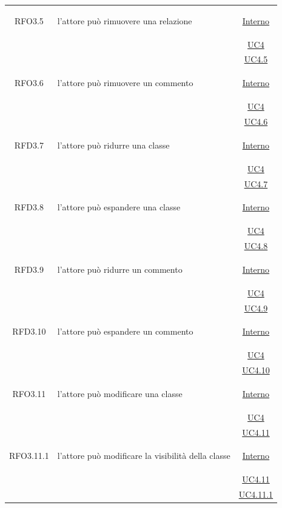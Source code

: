 \begin{itemize}
\begin{itemize}
\begin{itemize}
\begin{itemize}
\begin{longtable}{|c|>{\centering}m{7cm}|c|}
\hypertarget{RFO3.5}{RFO3.5} & l'attore può rimuovere una relazione &  \hyperlink{Interno}{Interno}\\
& &\hyperref[UC4]{UC4}\\
& &\hyperref[UC4.5]{UC4.5}\\ \hline

\hypertarget{RFO3.6}{RFO3.6} & l'attore può rimuovere un commento &  \hyperlink{Interno}{Interno}\\
& &\hyperref[UC4]{UC4}\\
& &\hyperref[UC4.6]{UC4.6}\\ \hline

\hypertarget{RFD3.7}{RFD3.7} & l'attore può ridurre una classe &  \hyperlink{Interno}{Interno}\\
& &\hyperref[UC4]{UC4}\\
& &\hyperref[UC4.7]{UC4.7}\\ \hline

\hypertarget{RFD3.8}{RFD3.8} & l'attore può espandere una classe &  \hyperlink{Interno}{Interno}\\
& &\hyperref[UC4]{UC4}\\
& &\hyperref[UC4.8]{UC4.8}\\ \hline

\hypertarget{RFD3.9}{RFD3.9} & l'attore può ridurre un commento &  \hyperlink{Interno}{Interno}\\
& &\hyperref[UC4]{UC4}\\
& &\hyperref[UC4.9]{UC4.9}\\ \hline

\hypertarget{RFD3.10}{RFD3.10} & l'attore può espandere un commento &  \hyperlink{Interno}{Interno}\\
& &\hyperref[UC4]{UC4}\\
& &\hyperref[UC4.10]{UC4.10}\\ \hline

\hypertarget{RFO3.11}{RFO3.11} & l'attore può modificare una classe &  \hyperlink{Interno}{Interno}\\
& &\hyperref[UC4]{UC4}\\
& &\hyperref[UC4.11]{UC4.11}\\ \hline

\hypertarget{RFO3.11.1}{RFO3.11.1} & l'attore può modificare la visibilità della classe &  \hyperlink{Interno}{Interno}\\
& &\hyperref[UC4.11]{UC4.11}\\
& &\hyperref[UC4.11.1]{UC4.11.1}\\ \hline


\end{longtable}
\end{itemize}
\end{itemize}
\end{itemize}
\end{itemize}
